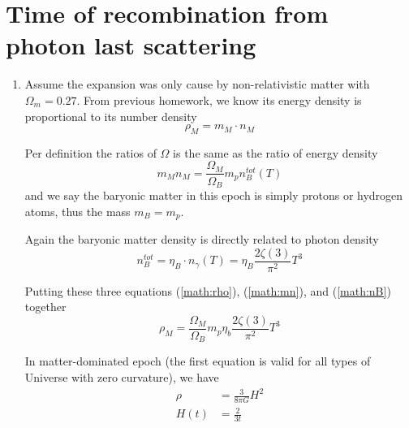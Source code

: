 \section{Time of recombination from photon last scattering}
\begin{enumerate}[label=\alph*)]
   \item Assume the expansion was only cause by non-relativistic matter with $\Omega_m = 0.27$.  From previous homework, we know its energy density is proportional to its number density
   \begin{equation}
      \rho_M = m_M \cdot n_M
      \label{math:rho}
   \end{equation}

   Per definition the ratios of $\Omega$ is the same as the ratio of energy density 
      \begin{equation}
         m_M n_M = \frac{\Omega_M}{\Omega_B} m_p n_B^{tot}(T)
         \label{math:mn}
      \end{equation}
      and we say the baryonic matter in this epoch is simply protons or hydrogen atoms, thus the mass $m_B = m_p$.

      Again the baryonic matter density is directly related to photon density
      \begin{equation}
         n_B^{tot} = \eta_B \cdot n_\gamma(T) = \eta_B \frac{2\zeta(3)}{\pi^2} T^3
         \label{math:nB}
      \end{equation}

      Putting these three equations (\ref{math:rho}), (\ref{math:mn}), and (\ref{math:nB}) together
      \begin{equation}
         \rho_M = \frac{\Omega_M}{\Omega_B} m_p \eta_b \frac{2\zeta(3)}{\pi^2} T^3
      \end{equation}

      In matter-dominated epoch (the first equation is valid for all types of Universe with zero curvature), we have
      \begin{align}
         \rho &= \frac{3}{8\pi G} H^2 \label{math:rho2}\\
         H(t) &= \frac{2}{3t} \label{math:Ht}
      \end{align}


\end{enumerate}
